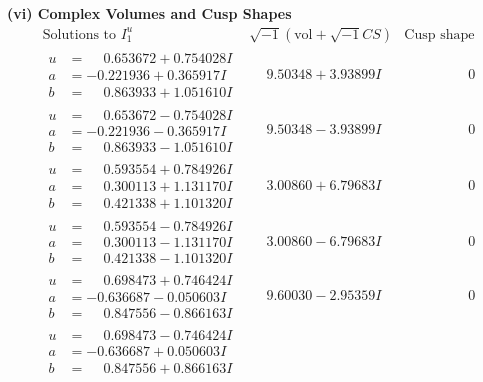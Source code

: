 \documentclass[1p]{elsarticle_modified}
\theoremstyle{definition}
\newcommand{\I}{\sqrt{-1}}
\begin{document}
\newpage\flushleft \textbf{(vi) Complex Volumes and Cusp Shapes}
$$\begin{array}{c|c|c}  
\text{Solutions to }I^u_{1}& \I (\text{vol} + \sqrt{-1}CS) & \text{Cusp shape}\\
 \hline 
\begin{aligned}
u &= \phantom{-}0.653672 + 0.754028 I \\
a &= -0.221936 + 0.365917 I \\
b &= \phantom{-}0.863933 + 1.051610 I\end{aligned}
 & \phantom{-}9.50348 + 3.93899 I & \phantom{-0.000000 } 0 \\ \hline\begin{aligned}
u &= \phantom{-}0.653672 - 0.754028 I \\
a &= -0.221936 - 0.365917 I \\
b &= \phantom{-}0.863933 - 1.051610 I\end{aligned}
 & \phantom{-}9.50348 - 3.93899 I & \phantom{-0.000000 } 0 \\ \hline\begin{aligned}
u &= \phantom{-}0.593554 + 0.784926 I \\
a &= \phantom{-}0.300113 + 1.131170 I \\
b &= \phantom{-}0.421338 + 1.101320 I\end{aligned}
 & \phantom{-}3.00860 + 6.79683 I & \phantom{-0.000000 } 0 \\ \hline\begin{aligned}
u &= \phantom{-}0.593554 - 0.784926 I \\
a &= \phantom{-}0.300113 - 1.131170 I \\
b &= \phantom{-}0.421338 - 1.101320 I\end{aligned}
 & \phantom{-}3.00860 - 6.79683 I & \phantom{-0.000000 } 0 \\ \hline\begin{aligned}
u &= \phantom{-}0.698473 + 0.746424 I \\
a &= -0.636687 - 0.050603 I \\
b &= \phantom{-}0.847556 - 0.866163 I\end{aligned}
 & \phantom{-}9.60030 - 2.95359 I & \phantom{-0.000000 } 0 \\ \hline\begin{aligned}
u &= \phantom{-}0.698473 - 0.746424 I \\
a &= -0.636687 + 0.050603 I \\
b &= \phantom{-}0.847556 + 0.866163 I\end{aligned}

\end{array}$$
\end{document}
